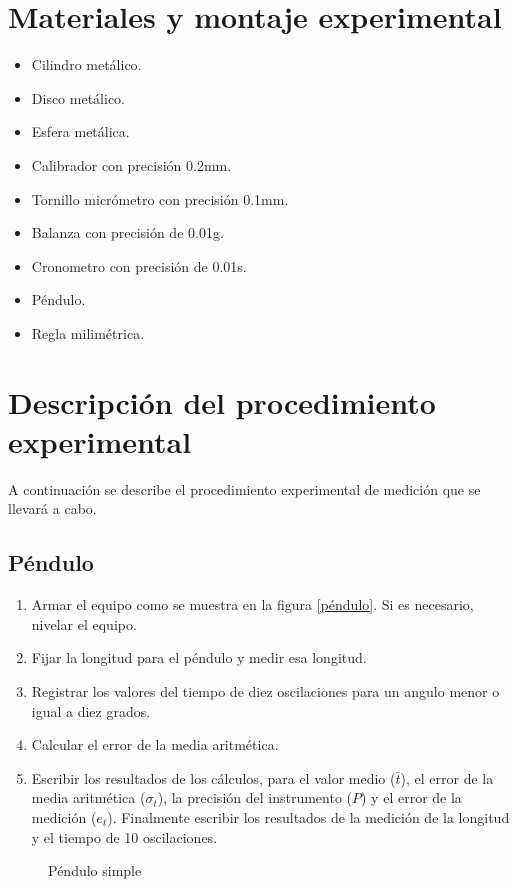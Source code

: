 \documentclass[letter,11pt]{article}
\begin{document}
\section{Materiales y montaje experimental}
\begin{itemize}
\item Cilindro metálico.
\item Disco metálico.
\item Esfera metálica.
\item Calibrador con precisión 0.2mm.
\item Tornillo micrómetro con precisión 0.1mm.
\item Balanza con precisión de 0.01g.
\item Cronometro con precisión de 0.01s.
\item Péndulo.
\item Regla milimétrica.
\end{itemize}

\section{Descripción del procedimiento experimental}
A continuación se describe el procedimiento experimental de medición que se
llevará a cabo.

\subsection{Péndulo}
\begin{enumerate}
\item Armar el equipo como se muestra en la figura \ref{péndulo}. Si es
necesario, nivelar el equipo.
\item Fijar la longitud para el péndulo y medir esa longitud.
\item Registrar los valores del tiempo de diez oscilaciones para un angulo menor
o igual a diez grados.
\item Calcular el error de la media aritmética.
\item Escribir los resultados de los cálculos, para el valor medio ($\bar{t}$),
el error de la media aritmética ($\sigma_t$), la precisión del instrumento ($P$)
y el error de la medición ($e_t$). Finalmente escribir los resultados de la
medición de la longitud y el tiempo de 10 oscilaciones.
\end{enumerate}

\begin{figure}
\centering

\caption{Péndulo simple}
\label{pendulo}
\end{figure}
\end{document}
